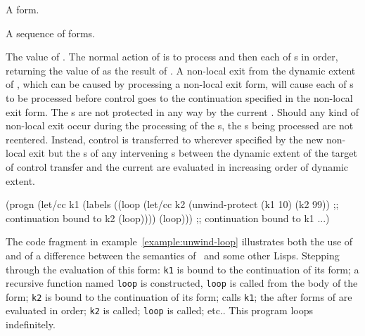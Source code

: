 \begin{optDefinition}
%
\Syntax
{}%
%
\begin{arguments}
    \item[\scdef{protected-form}] A form.
    \item[\scseqref{after-form}] A sequence of forms.
\end{arguments}
%
\result%
The value of .
%
\remarks%
The normal action of  is to process
 and then each of s in order, returning
the value of  as the result of .
A non-local exit from the dynamic extent of , which can be
caused by processing a non-local exit form, will cause each of
s to be processed before control goes to the continuation
specified in the non-local exit form.  The s are not protected
in any way by the current .  Should any kind of
non-local exit occur during the processing of the s, the
s being processed are not reentered.  Instead, control is
transferred to wherever specified by the new non-local exit but the
s of any intervening s between the
dynamic extent of the target of control transfer and the current
 are evaluated in increasing order of dynamic extent.
%
\examples
%
\begin{example}
\label{example:unwind-loop}
{\codeExample
(progn
  (let/cc k1
    (labels
      ((loop
         (let/cc k2
           (unwind-protect (k1 10) (k2 99))
         ;; continuation bound to k2
         (loop))))
      (loop)))
  ;; continuation bound to k1
  ...)
\endCodeExample}
\end{example}
%
The code fragment in example~\ref{example:unwind-loop} illustrates both the use
of  and of a difference between the semantics of
\eulisp\ and some other Lisps.  Stepping through the evaluation of this form:
{\tt k1} is bound to the continuation of its  form; a
recursive function named {\tt loop} is constructed, {\tt loop} is called from
the body of the  form; {\tt k2} is bound to the continuation
of its  form;  calls {\tt k1}; the
after forms of  are evaluated in order; {\tt k2} is
called; {\tt loop} is called; etc..  This program loops indefinitely.
%
\end{optDefinition}

